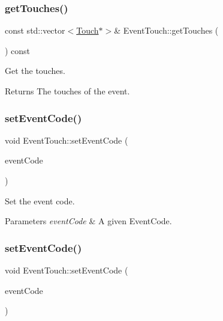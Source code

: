 \subsubsection{\texorpdfstring{get\+Touches()}{getTouches()}\hspace{0.1cm}{\footnotesize\ttfamily [2/2]}}
{\footnotesize\ttfamily const std\+::vector$<$\hyperlink{classTouch}{Touch}$\ast$$>$\& Event\+Touch\+::get\+Touches (\begin{DoxyParamCaption}{ }\end{DoxyParamCaption}) const\hspace{0.3cm}{\ttfamily [inline]}}

Get the touches.

\begin{DoxyReturn}{Returns}
The touches of the event. 
\end{DoxyReturn}
\mbox{\label{classEventTouch_ac26a1793d7fdd6d6010447b02721a637}} 
\subsubsection{\texorpdfstring{set\+Event\+Code()}{setEventCode()}\hspace{0.1cm}{\footnotesize\ttfamily [1/2]}}
{\footnotesize\ttfamily void Event\+Touch\+::set\+Event\+Code (\begin{DoxyParamCaption}\item[{\hyperlink{classEventTouch_a35816ad7349f0b7accc0a30a469b0087}{Event\+Code}}]{event\+Code }\end{DoxyParamCaption})\hspace{0.3cm}{\ttfamily [inline]}}

Set the event code.


\begin{DoxyParams}{Parameters}
{\em event\+Code} & A given Event\+Code. \\
\hline
\end{DoxyParams}
\mbox{\label{classEventTouch_ac26a1793d7fdd6d6010447b02721a637}} 
\subsubsection{\texorpdfstring{set\+Event\+Code()}{setEventCode()}\hspace{0.1cm}{\footnotesize\ttfamily [2/2]}}
{\footnotesize\ttfamily void Event\+Touch\+::set\+Event\+Code (\begin{DoxyParamCaption}\item[{\hyperlink{classEventTouch_a35816ad7349f0b7accc0a30a469b0087}{Event\+Code}}]{event\+Code }\end{DoxyParamCaption})\hspace{0.3cm}{\ttfamily [inline]}}

